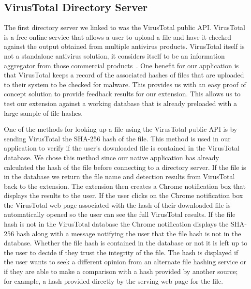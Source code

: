 \documentclass[letterpaper,twocolumn,10pt]{article}
\begin{document}
\subsection{VirusTotal Directory Server}

The first directory server we linked to was the VirusTotal public API. VirusTotal is a free online service that allows a user to upload a file and have it checked against the output obtained from multiple antivirus products. VirusTotal itself is not a standalone antivirus solution, it considers itself to be an information aggregator from those commercial products~\cite{vtabout}. One benefit for our application is that VirusTotal keeps a record of the associated hashes of files that are uploaded to their system to be checked for malware. This provides us with an easy proof of concept solution to provide feedback results for our extension. This allows us to test our extension against a working database that is already preloaded with a large sample of file hashes.

One of the methods for looking up a file using the VirusTotal public API is by sending VirusTotal the SHA-256 hash of the file. This method is used in our application to verify if the user's downloaded file is contained in the VirusTotal database. We chose this method since our native application has already calculated the hash of the file before connecting to a directory server. If the file is in the database we return the file name and detection results from VirusTotal back to the extension. The extension then creates a Chrome notification box that displays the results to the user. If the user clicks on the Chrome notification box the VirusTotal web page associated with the hash of their downloaded file is automatically opened so the user can see the full VirusTotal results. If the file hash is not in the VirusTotal database the Chrome notification displays the SHA-256 hash along with a message notifying the user that the file hash is not in the database. Whether the file hash is contained in the database or not it is left up to the user to decide if they trust the integrity of the file. The hash is displayed if the user wants to seek a different opinion from an alternate file hashing service or if they are able to make a comparison with a hash provided by another source; for example, a hash provided directly by the serving web page for the file.
\end{document}
